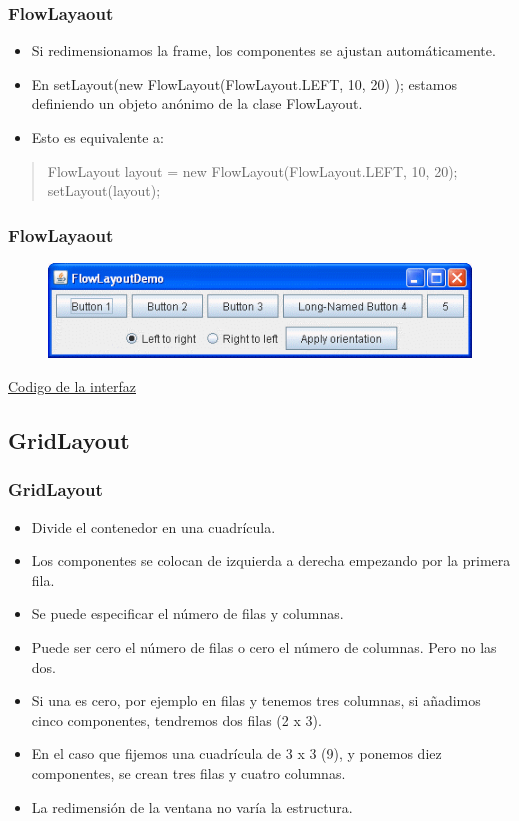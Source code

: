 \documentclass{beamer}
\begin{document}
\begin{frame}[fragile]
    \frametitle{FlowLayaout}
  \begin{itemize}[<+->]
  \item Si redimensionamos la frame, los componentes se ajustan automáticamente.
  \item En \alert{setLayout(new FlowLayout(FlowLayout.LEFT, 10, 20) );} estamos definiendo un objeto anónimo de la clase FlowLayout.
  \item Esto es equivalente a:
  \end{itemize}
  \pause
  \begin{quote}
  FlowLayout layout = new FlowLayout(FlowLayout.LEFT, 10, 20);\\
  setLayout(layout);

  \end{quote}
\end{frame}

\begin{frame}[fragile]
    \frametitle{FlowLayaout}
  \begin{figure}
\includegraphics[scale=0.7]{imagenes/fl.png}
\end{figure}  
\begin{center}
{\color{blue}\href{https://docs.oracle.com/javase/tutorial/displayCode.html?code=https://docs.oracle.com/javase/tutorial/uiswing/examples/layout/FlowLayoutDemoProject/src/layout/FlowLayoutDemo.java}
{Codigo de la interfaz}}
\end{center}
\end{frame}

\subsection{GridLayout}
\begin{frame}[fragile]
\frametitle{GridLayout}
\begin{itemize}[<+->]
\item Divide el contenedor en una cuadrícula. 
\item Los componentes se colocan de izquierda a derecha empezando por la primera fila.
\item Se puede especificar el número de filas y columnas.
\item Puede ser cero el número de filas o cero el número de columnas. Pero no las dos.
\item Si una es cero, por ejemplo en filas y tenemos tres columnas, si añadimos cinco componentes, tendremos dos filas (2 x 3).
\item En el caso que fijemos una cuadrícula de 3 x 3 (9), y ponemos diez componentes, se crean tres filas y cuatro columnas.
\item La redimensión de la ventana no varía la estructura.
\end{itemize}
\end{frame}
\end{document}
